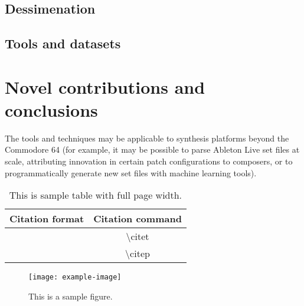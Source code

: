 \documentclass[10pt]{article}
\begin{document}
\begin{multicols*}{2}
  \subsection{Dessimenation}

  \subsection{Tools and datasets}

\section{Novel contributions and conclusions}

The tools and techniques may be applicable to synthesis platforms
beyond the Commodore 64 (for example, it may be possible to parse
Ableton Live set files at scale, attributing innovation in certain
patch configurations to composers, or to programmatically generate new
set files with machine learning tools).






\begin{table*}
        \centering
        \begin{tabular}{cc}
                \hline
                \textbf{Citation format} & \textbf{Citation command} \\
                \hline
                \citet{APA:83} & \textbackslash{}citet{} \\
                \citep{APA:83} & \textbackslash{}citep{} \\
                \hline
        \end{tabular}
        \caption{This is sample table with full page width.}
        \label{tbl:tbl1}
\end{table*}

\begin{figure}[H]
    \centering
        \texttt{[image: example-image]}
        \caption{This is a sample figure.}
        \label{fig:fig1}
\end{figure}

\end{multicols*}

\clearpage



\end{document}
